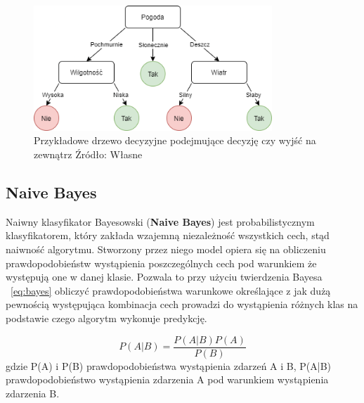 \begin{figure}[h]
    \centering
    \includegraphics[width=0.8\textwidth]{./Img/BinaryTree.png}
    \caption{Przykładowe drzewo decyzyjne podejmujące decyzję czy wyjść na zewnątrz Źródło: Własne}
\end{figure}


\subsection{Naive Bayes}

Naiwny klasyfikator Bayesowski (\textbf{Naive Bayes}) jest probabilistycznym klasyfikatorem, który
zakłada wzajemną niezależność wszystkich cech, stąd naiwność algorytmu. Stworzony przez niego model
opiera się na obliczeniu prawdopodobieństw wystąpienia poszczególnych cech pod warunkiem że 
występują one w danej klasie. Pozwala to przy użyciu twierdzenia Bayesa ~\ref{eq:bayes} obliczyć prawdopodobieństwa 
warunkowe określające z jak dużą pewnością występująca kombinacja cech prowadzi do 
wystąpienia różnych klas na podstawie czego algorytm wykonuje predykcję. 


\begin{equation}
    \label{eq:bayes}
    P(A|B) = \frac{P(A|B)P(A)}{P(B)}
\end{equation}
gdzie P(A) i P(B) prawdopodobieństwa wystąpienia zdarzeń A i B, P(A|B) prawdopodobieństwo wystąpienia
zdarzenia A pod warunkiem wystąpienia zdarzenia B.

